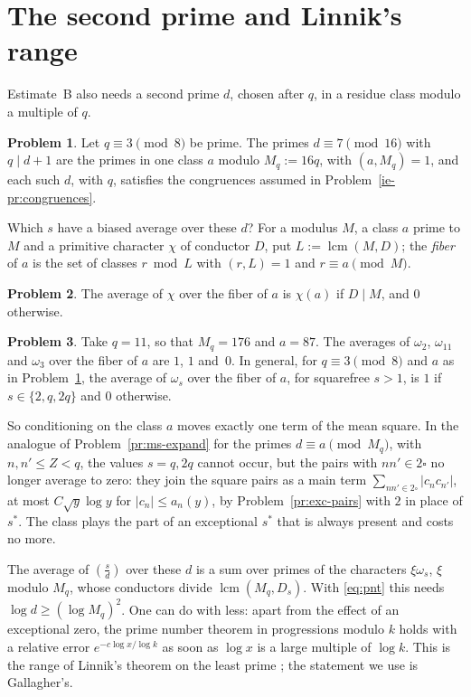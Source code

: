 \documentclass[reqno]{amsart}
\theoremstyle{definition}
\newtheorem{problem}{Problem}[section]
\theoremstyle{plain}
\newcommand{\sq}{\square}
\begin{document}
\section{The second prime and Linnik's range}\label{sec:linnik}

Estimate~B also needs a second prime $d$, chosen after $q$, in a residue class modulo a multiple of $q$.

\begin{problem}\label{pr:class}
Let $q \equiv 3 \pmod 8$ be prime.  The primes $d \equiv 7 \pmod{16}$ with $q \mid d + 1$ are the primes in one class $a$ modulo $M_q := 16q$, with $(a, M_q) = 1$, and each such $d$, with $q$, satisfies the congruences assumed in Problem~\ref{ie-pr:congruences}.
\end{problem}

Which $s$ have a biased average over these $d$?  For a modulus $M$, a class $a$ prime to $M$ and a primitive character $\chi$ of conductor $D$, put $L := \operatorname{lcm}(M, D)$; the \emph{fiber} of $a$ is the set of classes $r \bmod L$ with $(r, L) = 1$ and $r \equiv a \pmod M$.

\begin{problem}\label{pr:fiber}
The average of $\chi$ over the fiber of $a$ is $\chi(a)$ if $D \mid M$, and $0$ otherwise.
\end{problem}

\begin{problem}\label{pr:fiber-ex}
Take $q = 11$, so that $M_q = 176$ and $a = 87$.  The averages of $\omega_2$, $\omega_{11}$ and $\omega_3$ over the fiber of $a$ are $1$, $1$ and~$0$.  In general, for $q \equiv 3 \pmod 8$ and $a$ as in Problem~\ref{pr:class}, the average of $\omega_s$ over the fiber of $a$, for squarefree $s > 1$, is $1$ if $s \in \{2, q, 2q\}$ and $0$ otherwise.
\end{problem}

So conditioning on the class $a$ moves exactly one term of the mean square.  In the analogue of Problem~\ref{pr:ms-expand} for the primes $d \equiv a \pmod{M_q}$, with $n, n' \le Z < q$, the values $s = q, 2q$ cannot occur, but the pairs with $n n' \in 2\sq$ no longer average to zero: they join the square pairs as a main term $\sum_{n n' \in 2\sq} \lvert c_n c_{n'} \rvert$, at most $C \sqrt y \log y$ for $\lvert c_n \rvert \le a_n(y)$, by Problem~\ref{pr:exc-pairs} with $2$ in place of $s^*$.  The class plays the part of an exceptional $s^*$ that is always present and costs no more.

The average of $(\frac sd)$ over these $d$ is a sum over primes of the characters $\xi \omega_s$, $\xi$ modulo $M_q$, whose conductors divide $\operatorname{lcm}(M_q, D_s)$.  With \eqref{eq:pnt} this needs $\log d \ge (\log M_q)^2$.  One can do with less: apart from the effect of an exceptional zero, the prime number theorem in progressions modulo $k$ holds with a relative error $e^{-c\log x/\log k}$ as soon as $\log x$ is a large multiple of $\log k$.  This is the range of Linnik's theorem on the least prime \cite{Lin}; the statement we use is Gallagher's.
\end{document}
